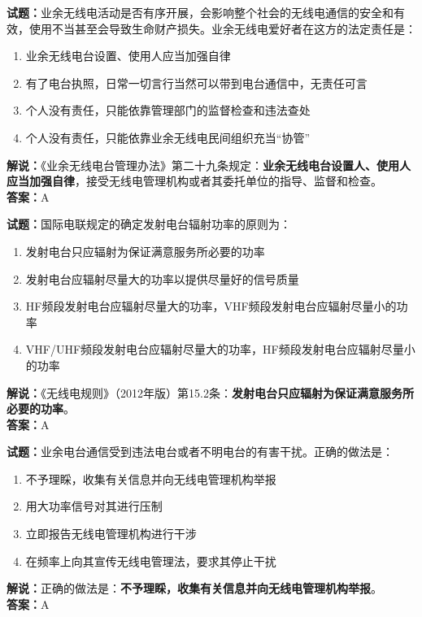 \documentclass{ctexbook}
\begin{document}
\bigskip


\noindent\textbf{试题：}业余无线电活动是否有序开展，会影响整个社会的无线电通信的安全和有效，使用不当甚至会导致生命财产损失。业余无线电爱好者在这方的法定责任是：
\begin{enumerate}[leftmargin=3em]
	\item 业余无线电台设置、使用人应当加强自律
	\item 有了电台执照，日常一切言行当然可以带到电台通信中，无责任可言
	\item 个人没有责任，只能依靠管理部门的监督检查和违法查处
	\item 个人没有责任，只能依靠业余无线电民间组织充当“协管”
\end{enumerate}
\noindent\textbf{解说：}《业余无线电台管理办法》第二十九条规定：\textbf{业余无线电台设置人、使用人应当加强自律}，接受无线电管理机构或者其委托单位的指导、监督和检查。\\\noindent\textbf{答案：}A



\bigskip


\noindent\textbf{试题：}国际电联规定的确定发射电台辐射功率的原则为：
\begin{enumerate}[leftmargin=3em]
	\item 发射电台只应辐射为保证满意服务所必要的功率
	\item 发射电台应辐射尽量大的功率以提供尽量好的信号质量
	\item HF频段发射电台应辐射尽量大的功率，VHF频段发射电台应辐射尽量小的功率
	\item VHF/UHF频段发射电台应辐射尽量大的功率，HF频段发射电台应辐射尽量小的功率
\end{enumerate}
\noindent\textbf{解说：}《无线电规则》（2012年版）第15.2条：\textbf{发射电台只应辐射为保证满意服务所必要的功率}。\\\noindent\textbf{答案：}A



\bigskip


\noindent\textbf{试题：}业余电台通信受到违法电台或者不明电台的有害干扰。正确的做法是：
\begin{enumerate}[leftmargin=3em]
	\item 不予理睬，收集有关信息并向无线电管理机构举报
	\item 用大功率信号对其进行压制
	\item 立即报告无线电管理机构进行干涉
	\item 在频率上向其宣传无线电管理法，要求其停止干扰
\end{enumerate}
\noindent\textbf{解说：}正确的做法是：\textbf{不予理睬，收集有关信息并向无线电管理机构举报}。\\\noindent\textbf{答案：}A
\end{document}
